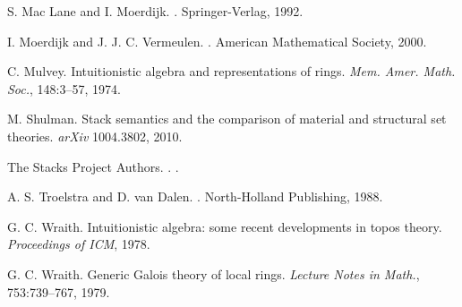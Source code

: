 \documentclass[10pt,utf8,notheorems,compress]{beamer}
\newcommand{\?}{\,{:}\,}
\renewcommand{\_}{\mathpunct{.}\,}
\newcommand{\backupend}{
  \addtocounter{framenumbervorappendix}{-\value{framenumber}}
  \addtocounter{framenumber}{\value{framenumbervorappendix}} 
}
\begin{document}
{\begin{thebibliography}{18}
      S. Mac Lane and I. Moerdijk.
      .
      \newblock Springer-Verlag, 1992.

      I. Moerdijk and J. J. C. Vermeulen.
      .
      \newblock American Mathematical Society, 2000.

      C. Mulvey.
      \newblock Intuitionistic algebra and representations of rings.
      \newblock \emph{Mem. Amer. Math. Soc.}, 148:3--57, 1974.

      M. Shulman.
      \newblock Stack semantics and the comparison of material and structural set theories.
      \newblock \emph{arXiv} 1004.3802, 2010.

      The Stacks Project Authors.
      .
      .

      A. S. Troelstra and D. van Dalen.
      .
      \newblock North-Holland Publishing, 1988.

      G. C. Wraith.
      \newblock Intuitionistic algebra: some recent developments in topos theory.
      \newblock \emph{Proceedings of ICM}, 1978.

      G. C. Wraith.
      \newblock Generic Galois theory of local rings.
      \newblock \emph{Lecture Notes in Math.}, 753:739--767, 1979.
  \end{thebibliography}
}
\backupend



\end{document}
